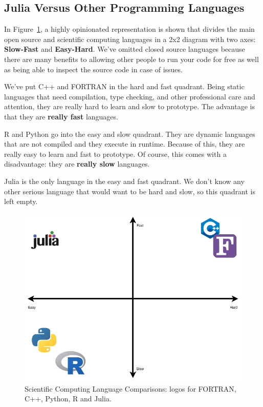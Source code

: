 \documentclass[
  notoc %
]{tufte-book}
\begin{document}
\hypertarget{julia-versus-other-programming-languages}{%
\subsection{Julia Versus Other Programming
Languages}\label{julia-versus-other-programming-languages}}

In Figure~\ref{fig:language_comparison}, a highly opinionated
representation is shown that divides the main open source and scientific
computing languages in a 2x2 diagram with two axes: \textbf{Slow-Fast}
and \textbf{Easy-Hard}. We've omitted closed source languages because
there are many benefits to allowing other people to run your code for
free as well as being able to inspect the source code in case of issues.

We've put C++ and FORTRAN in the hard and fast quadrant. Being static
languages that need compilation, type checking, and other professional
care and attention, they are really hard to learn and slow to prototype.
The advantage is that they are \textbf{really fast} languages.

R and Python go into the easy and slow quadrant. They are dynamic
languages that are not compiled and they execute in runtime. Because of
this, they are really easy to learn and fast to prototype. Of course,
this comes with a disadvantage: they are \textbf{really slow} languages.

Julia is the only language in the easy and fast quadrant. We don't know
any other serious language that would want to be hard and slow, so this
quadrant is left empty.

\begin{figure}
\hypertarget{fig:language_comparison}{%
\centering
\includegraphics{images/language_comparisons.png}
\caption{Scientific Computing Language Comparisons: logos for FORTRAN,
C++, Python, R and Julia.}\label{fig:language_comparison}
}
\end{figure}
\end{document}

